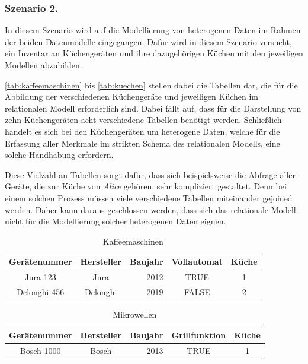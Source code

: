 \subsubsection{Szenario 2.}
In diesem Szenario wird auf die Modellierung von heterogenen Daten im Rahmen der beiden Datenmodelle eingegangen. Dafür wird in diesem Szenario versucht, ein Inventar an Küchengeräten und ihre dazugehörigen Küchen mit den jeweiligen Modellen abzubilden. 

\autoref{tab:kaffeemaschinen} bis \autoref{tab:kuechen} stellen dabei die Tabellen dar, die für die Abbildung der verschiedenen Küchengeräte und jeweiligen Küchen im relationalen Modell erforderlich sind. Dabei fällt auf, dass für die Darstellung von zehn Küchengeräten acht verschiedene Tabellen benötigt werden. Schließlich handelt es sich bei den Küchengeräten um heterogene Daten, welche für die Erfassung aller Merkmale im strikten Schema des relationalen Modells, eine solche Handhabung erfordern. 

Diese Vielzahl an Tabellen sorgt dafür, dass sich beispielsweise die Abfrage aller Geräte, die zur Küche von \textit{Alice} gehören, sehr kompliziert gestaltet. Denn bei einem solchen Prozess müssen viele verschiedene Tabellen miteinander gejoined werden. Daher kann daraus geschlossen werden, dass sich das relationale Modell nicht für die Modellierung solcher heterogenen Daten eignen.

\begin{table}[!ht]
    \centering
    \begin{tabular}{c|c|r|c|c}
    \hline
    \rowcolor[HTML]{EFEFEF} 
    \textbf{Gerätenummer} & \textbf{Hersteller} & \multicolumn{1}{c|}{\cellcolor[HTML]{EFEFEF}\textbf{Baujahr}} & \textbf{Vollautomat} & \textbf{Küche} \\ \hline
    Jura-123 & Jura & 2012 & TRUE & 1 \\
    Delonghi-456 & Delonghi & 2019 & FALSE & 2 \\ \hline
    \end{tabular}
    \caption{Kaffeemaschinen}
    \label{tab:kaffeemaschinen}
\end{table}

\begin{table}[!ht]
    \centering
    \begin{tabular}{c|c|c|c|c}
    \hline
    \rowcolor[HTML]{EFEFEF} 
    \textbf{Gerätenummer} & \textbf{Hersteller} & \textbf{Baujahr} & \textbf{Grillfunktion} & \textbf{Küche} \\ \hline
    Bosch-1000 & Bosch & \multicolumn{1}{r|}{2013} & TRUE & 1 \\ \hline
    \end{tabular}
    \caption{Mikrowellen}
    \label{tab:mikrowellen}
\end{table}


